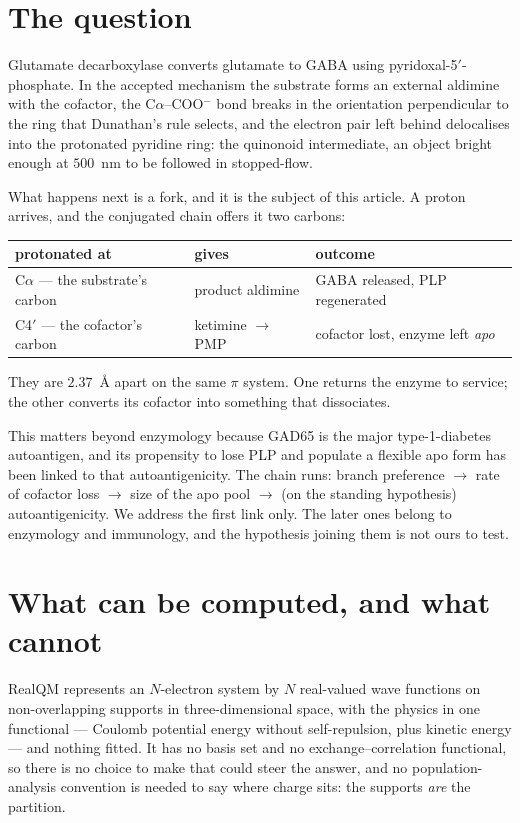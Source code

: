 \documentclass[11pt]{article}
\newcommand{\Ca}{C\ensuremath{\alpha}}
\newcommand{\Cfp}{C4\ensuremath{'}}
\begin{document}
\section{The question}

Glutamate decarboxylase converts glutamate to GABA using pyridoxal-5$'$-phosphate. In the accepted
mechanism the substrate forms an external aldimine with the cofactor, the \Ca--COO$^-$ bond breaks
in the orientation perpendicular to the ring that Dunathan's rule selects, and the electron pair
left behind delocalises into the protonated pyridine ring: the quinonoid intermediate, an object
bright enough at $500$~nm to be followed in stopped-flow.

What happens next is a fork, and it is the subject of this article. A proton arrives, and the
conjugated chain offers it two carbons:
\begin{center}
\small
\begin{tabular}{@{}lll@{}}
\toprule
protonated at & gives & outcome\\
\midrule
\Ca{} --- the substrate's carbon & product aldimine & GABA released, PLP regenerated\\
\Cfp{} --- the cofactor's carbon & ketimine $\to$ PMP & cofactor lost, enzyme left \emph{apo}\\
\bottomrule
\end{tabular}
\end{center}
\noindent They are $2.37$~\AA{} apart on the same $\pi$ system. One returns the enzyme to service;
the other converts its cofactor into something that dissociates.

This matters beyond enzymology because GAD65 is the major type-1-diabetes autoantigen, and its
propensity to lose PLP and populate a flexible apo form has been linked to that autoantigenicity.
The chain runs: branch preference $\to$ rate of cofactor loss $\to$ size of the apo pool $\to$ (on
the standing hypothesis) autoantigenicity. We address the first link only. The later ones belong to
enzymology and immunology, and the hypothesis joining them is not ours to test.

\section{What can be computed, and what cannot}

RealQM represents an $N$-electron system by $N$ real-valued wave functions on non-overlapping
supports in three-dimensional space, with the physics in one functional --- Coulomb potential energy
without self-repulsion, plus kinetic energy --- and nothing fitted. It has no basis set and no
exchange--correlation functional, so there is no choice to make that could steer the answer, and no
population-analysis convention is needed to say where charge sits: the supports \emph{are} the
partition.
\end{document}
